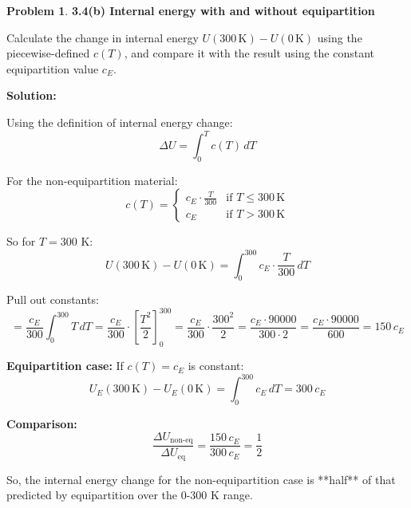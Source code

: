 \documentclass[12pt]{article}
\theoremstyle{definition} %
\newtheorem{problem}{Problem}
\theoremstyle{plain} %
\begin{document}
\begin{problem}
    \textbf{3.4(b) Internal energy with and without equipartition}

    Calculate the change in internal energy $U(300\,\text{K}) - U(0\,\text{K})$ using the piecewise-defined $c(T)$, and compare it with the result using the constant equipartition value $c_E$.

    \textbf{Solution:}

    Using the definition of internal energy change:
    \[
        \Delta U = \int_{0}^{T} c(T)\,dT
    \]

    For the non-equipartition material:
    \[
        c(T) =
        \begin{cases}
            c_E \cdot \frac{T}{300} & \text{if } T \leq 300\,\text{K} \\
            c_E & \text{if } T > 300\,\text{K}
        \end{cases}
    \]

    So for $T = 300$ K:
    \[
        U(300\,\text{K}) - U(0\,\text{K}) = \int_0^{300} c_E \cdot \frac{T}{300} \, dT
    \]

    Pull out constants:
    \[
        = \frac{c_E}{300} \int_0^{300} T\,dT = \frac{c_E}{300} \cdot \left[\frac{T^2}{2}\right]_0^{300}
        = \frac{c_E}{300} \cdot \frac{300^2}{2}
        = \frac{c_E \cdot 90000}{300 \cdot 2} = \frac{c_E \cdot 90000}{600}
        = 150\,c_E
    \]

    \textbf{Equipartition case:} If $c(T) = c_E$ is constant:
    \[
        U_E(300\,\text{K}) - U_E(0\,\text{K}) = \int_0^{300} c_E\,dT = 300\,c_E
    \]

    \textbf{Comparison:}
    \[
        \frac{\Delta U_{\text{non-eq}}}{\Delta U_{\text{eq}}} = \frac{150\,c_E}{300\,c_E} = \frac{1}{2}
    \]

    So, the internal energy change for the non-equipartition case is **half** of that predicted by equipartition over the 0-300 K range.
\end{problem}
\end{document}
